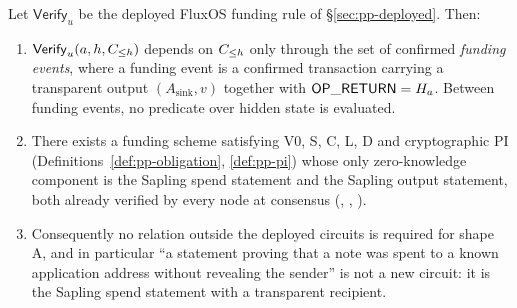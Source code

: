 \begin{proposition}
\label{prop:pp-scope}
Let $\mathsf{Verify}_u$ be the deployed FluxOS funding rule of \S\ref{sec:pp-deployed}. Then:
\begin{enumerate}
  \item[(i)] $\mathsf{Verify}_u(a,h,C_{\le h})$ depends on $C_{\le h}$ only through the set
    of confirmed \emph{funding events}, where a funding event is a confirmed transaction carrying a
    transparent output $(A_{\mathrm{sink}}, v)$ together with $\mathsf{OP\_RETURN} = H_{a}$. Between
    funding events, no predicate over hidden state is evaluated.
  \item[(ii)] There exists a funding scheme satisfying V0, S, C, L, D and cryptographic PI
    (Definitions~\ref{def:pp-obligation}, \ref{def:pp-pi}) whose only zero-knowledge component is the
    Sapling spend statement and the Sapling output statement, both already verified by every
    \fluxd{} node at consensus (\shipped,
    , ).
  \item[(iii)] Consequently no relation outside the deployed circuits is required for shape A, and in
    particular ``a statement proving that a note was spent to a known application address without
    revealing the sender'' is not a new circuit: it is the Sapling spend statement with a transparent
    recipient.
\end{enumerate}
\end{proposition}

